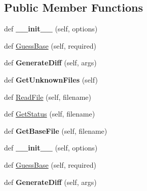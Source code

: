 \subsection*{Public Member Functions}
\begin{DoxyCompactItemize}
\item 
def {\bfseries \+\_\+\+\_\+init\+\_\+\+\_\+} (self, options)\hypertarget{classupload_1_1SubversionVCS_a8333f94e27335ce83eed0cc3f5a1eeb0}{}\label{classupload_1_1SubversionVCS_a8333f94e27335ce83eed0cc3f5a1eeb0}

\item 
def \hyperlink{classupload_1_1SubversionVCS_a7d22d459469a757270502ce0dccacbd2}{Guess\+Base} (self, required)
\item 
def {\bfseries Generate\+Diff} (self, args)\hypertarget{classupload_1_1SubversionVCS_a07c2d341f2c7df2772dd7f85e89b0212}{}\label{classupload_1_1SubversionVCS_a07c2d341f2c7df2772dd7f85e89b0212}

\item 
def {\bfseries Get\+Unknown\+Files} (self)\hypertarget{classupload_1_1SubversionVCS_a494ba1010992d83cac015bc396ab693a}{}\label{classupload_1_1SubversionVCS_a494ba1010992d83cac015bc396ab693a}

\item 
def \hyperlink{classupload_1_1SubversionVCS_a340d269b74386ac863636f6b0683d9f4}{Read\+File} (self, filename)
\item 
def \hyperlink{classupload_1_1SubversionVCS_ac3785eb1fa561088206d01570f9fe982}{Get\+Status} (self, filename)
\item 
def {\bfseries Get\+Base\+File} (self, filename)\hypertarget{classupload_1_1SubversionVCS_a29dec4941de0824734d6842a2f33ffc3}{}\label{classupload_1_1SubversionVCS_a29dec4941de0824734d6842a2f33ffc3}

\item 
def {\bfseries \+\_\+\+\_\+init\+\_\+\+\_\+} (self, options)\hypertarget{classupload_1_1SubversionVCS_a8333f94e27335ce83eed0cc3f5a1eeb0}{}\label{classupload_1_1SubversionVCS_a8333f94e27335ce83eed0cc3f5a1eeb0}

\item 
def \hyperlink{classupload_1_1SubversionVCS_a7d22d459469a757270502ce0dccacbd2}{Guess\+Base} (self, required)
\item 
def {\bfseries Generate\+Diff} (self, args)\hypertarget{classupload_1_1SubversionVCS_a07c2d341f2c7df2772dd7f85e89b0212}{}\label{classupload_1_1SubversionVCS_a07c2d341f2c7df2772dd7f85e89b0212}


\end{DoxyCompactItemize}
